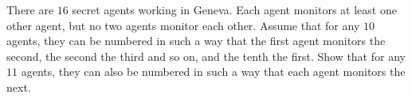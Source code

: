 There are $16$ secret agents working in Geneva. Each agent monitors at least one other agent,
but no two agents monitor each other. Assume that for any $10$ agents,
they can be numbered in such a way that the first agent monitors the second,
the second the third and so on, and the tenth the first. Show that for any $11$ agents,
they can also be numbered in such a way that each agent monitors the next.